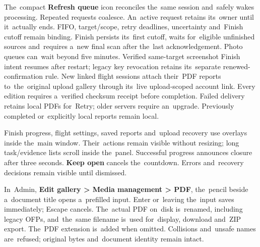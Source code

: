 \documentclass[11pt,a4paper]{article}
\newcommand{\ui}[1]{\textbf{#1}}
\begin{document}
The~compact \ui{Refresh queue} icon reconciles the~same session and~safely
wakes processing. Repeated requests coalesce. An~active request retains
its~owner until it~actually ends. FIFO, target/scope, retry deadlines,
uncertainty and~Finish cutoff remain binding. Finish persists its~first cutoff,
waits for~eligible unfinished sources and~requires a~new final scan after
the~last acknowledgement. Photo queues can~wait beyond five minutes.
Verified same-target screenshot Finish intent resumes after restart;
legacy key revocation retains its~separate renewed-confirmation rule.
New linked flight sessions attach their~PDF reports to~the~original upload
gallery through its~live upload-scoped account link. Every edition requires
a~verified checksum receipt before completion. Failed delivery retains local
PDFs for~Retry; older servers require an~upgrade. Previously completed
or~explicitly local reports remain local.

Finish progress, flight settings, saved reports and~upload recovery use overlays
inside the~main window. Their~actions remain visible without resizing;
long task/evidence lists scroll inside the~panel. Successful progress announces
closure after three seconds. \ui{Keep open} cancels the~countdown. Errors
and~recovery decisions remain visible until dismissed.

In~Admin, \ui{Edit gallery > Media management > PDF}, the~pencil beside
a~document title opens a~prefilled input. Enter or~leaving the~input saves
immediately; Escape cancels. The~actual PDF on~disk is~renamed, including
legacy OFPs, and~the~same filename is~used for~display, download and~ZIP export.
The~PDF extension is~added when omitted. Collisions and~unsafe names
are~refused; original bytes and~document identity remain intact.
\end{document}
